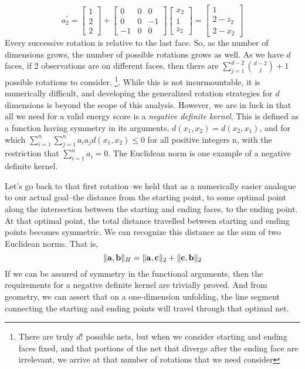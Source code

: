   \begin{equation}
    \label{eq:2drotation}
    a_2^{\prime} = \begin{bmatrix}
    1 \\
    2 \\
    2
    \end{bmatrix}
    +
    \begin{bmatrix}
    0 & 0 & 0  \\
    0 & 0 & -1 \\
    -1 & 0 & 0
    \end{bmatrix}
    \begin{bmatrix}
    x_2 \\
    1 \\
    z_2
    \end{bmatrix} = \begin{bmatrix}
    1 \\
    2 - z_2 \\
    2 - x_2
    \end{bmatrix}
  \end{equation}
Every successive rotation is relative to the last face.  So, as the number of dimensions grows, the
  number of possible rotations grows as well.  As we have $d$ faces, if 2 observations are on
  different faces, then there are $\sum_{j = 1}^{d-2}\binom{d-2}{j} + 1$ possible rotations to
  consider. \footnote{There are truly $d!$ possible nets, but when we consider starting and ending
  faces fixed, and that portions of the net that diverge after the ending face are irrelevant,
  we arrive at that number of rotations that we need consider}.  While this is not
  insurmountable, it is numerically difficult, and developing the generalized rotation strategies
  for $d$ dimensions is beyond the scope of this analysis. However, we are in luck in that all we
  need for a valid energy score is a \emph{negative definite kernel}.  This is defined as a function
  having symmetry in its arguments, $d(x_1,x_2) = d(x_2,x_1)$, and for which
  $\sum_{i =1}^n\sum_{j=1}^na_ia_jd(x_1,x_2) \leq 0$ for all positive integers n, with the
  restriction that $\sum_{i=1}^na_i = 0$.  The Euclidean norm is one example of a negative definite
  kernel.

Let's go back to that first rotation--we held that as a numerically easier analogue to our actual
  goal--the distance from the starting point, to some optimal point along the intersection between
  the starting and ending faces, to the ending point.  At that optimal point, the total distance
  travelled between starting and ending points becomes symmetric.  We can
  recognize this distance as the sum of two Euclidean norms.  That is,
  \begin{equation}
    \lVert {\bf a},{\bf b}\rVert_{H} = \lVert {\bf a}, {\bf c} \rVert_2 + \lVert {\bf c},{\bf b}\rVert_2
  \end{equation}
  If we can be assured of symmetry in the functional arguments, then the requirements for a negative
  definite kernel are trivially proved.  And from geometry, we can
  assert that on a one-dimension unfolding, the line segment connecting the starting and ending
  points will travel through that optimal net.

